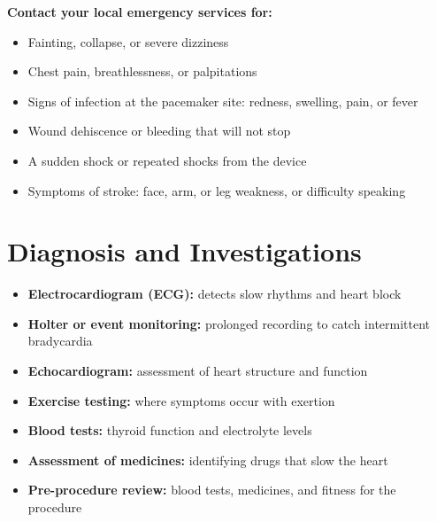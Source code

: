 \textbf{Contact your local emergency services for:}
\begin{itemize}
    \item Fainting, collapse, or severe dizziness
    \item Chest pain, breathlessness, or palpitations
    \item Signs of infection at the pacemaker site: redness, swelling, pain, or fever
    \item Wound dehiscence or bleeding that will not stop
    \item A sudden shock or repeated shocks from the device
    \item Symptoms of stroke: face, arm, or leg weakness, or difficulty speaking
\end{itemize}

\section*{Diagnosis and Investigations}
\begin{itemize}
    \item \textbf{Electrocardiogram (ECG):} detects slow rhythms and heart block
    \item \textbf{Holter or event monitoring:} prolonged recording to catch intermittent bradycardia
    \item \textbf{Echocardiogram:} assessment of heart structure and function
    \item \textbf{Exercise testing:} where symptoms occur with exertion
    \item \textbf{Blood tests:} thyroid function and electrolyte levels
    \item \textbf{Assessment of medicines:} identifying drugs that slow the heart
    \item \textbf{Pre-procedure review:} blood tests, medicines, and fitness for the procedure
\end{itemize}

